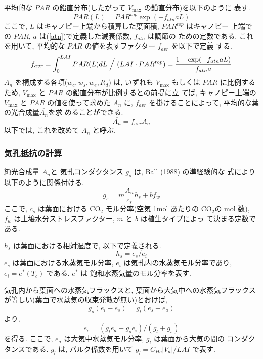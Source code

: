 平均的な $PAR$ の鉛直分布(したがって $V_{\max}$ の鉛直分布)を以下のように
表す. 
\begin{equation}
 PAR(L) = PAR^{top} \exp(- f_{atn} a L)
\end{equation}
ここで, $L$ はキャノピー上端から積算した葉面積, $PAR^{top}$ はキャノピー
上端での $PAR$, $a$ は(\ref{atn})で定義した減衰係数, $f_{atn}$ は調節の
ための定数である. 
これを用いて, 平均的な $PAR$ の値を表すファクター $f_{avr}$ を以下で定義
する. 
\begin{equation}
 f_{avr} = \int_0^{LAI} PAR(L) dL \Bigm / (LAI \cdot PAR^{top})
 = \frac{1 - \exp(- f_{atn} a L)}{f_{atn} a}
\end{equation}
$A_n$ を構成する各項($w_c, w_s, w_e, R_d$) は, いずれも $V_{\max}$ もしくは
$PAR$ に比例するため, $V_{\max}$ と $PAR$ の鉛直分布が比例するとの前提に立
てば, キャノピー上端の $V_{\max}$ と $PAR$ の値を使って求めた $A_n$ に,
$f_{avr}$ を掛けることによって, 平均的な葉の光合成量$\overline{A_n}$を求
めることができる. 
\begin{equation}
 \overline{A_n} = f_{avr} A_n
\end{equation}
以下では, これを改めて $A_n$ と呼ぶ. 

\subsubsection{気孔抵抗の計算}

純光合成量 $A_n$と 気孔コンダクタンス $g_s$ は, Ball (1988) の準経験的な
式により以下のように関係付ける. 
\begin{equation}
 g_s = m \frac {A_n}{c_s} h_s + b f_w 
\label{photo_gs}
\end{equation}
ここで, $c_s$ は葉面における CO$_2$ モル分率(空気 1mol あたりの CO$_2$の
mol 数), $f_w$ は土壌水分ストレスファクター, $m$ と $b$ は植生タイプによっ
て決まる定数である. 

$h_s$ は葉面における相対湿度で, 以下で定義される. 
\begin{equation}
 h_s = e_s / e_i
\label{photo_h}
\end{equation}
$e_s$ は葉面における水蒸気モル分率, 
$e_i$ は気孔内の水蒸気モル分率であり, $e_i = e^*(T_c)$ である. $e^*$ は
飽和水蒸気量のモル分率を表す. 

気孔内から葉面への水蒸気フラックスと, 葉面から大気中への水蒸気フラックス
が等しい(葉面で水蒸気の収束発散が無い)とおけば, 
\begin{equation}
 g_s(e_i - e_s) = g_l(e_s - e_a)
\label{photo_esei}
\end{equation}
より, 
\begin{equation}
 e_s = ( g_l e_a + g_s e_i ) / ( g_l + g_s )
\label{photo_es}
\end{equation}
を得る. ここで, $e_a$ は大気中水蒸気モル分率, $g_l$ は葉面から大気の間の
コンダクタンスである. $g_l$ は, バルク係数を用いて $g_l = C_{Hc}|V_a| /
LAI$ で表す. 

